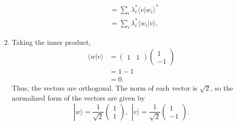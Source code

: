 \documentclass[12 pt]{article}
\begin{document}
\begin{enumerate}
\begin{align*}
	&=\sum_i\lambda_i^* \langle v|w_i\rangle^* \\
	&=\sum_i\lambda_i^* \langle w_i|v\rangle.
\end{align*}
\item Taking the inner product,
\begin{align*}
	\langle w|v\rangle &= \begin{pmatrix}
		1 & 1
	\end{pmatrix}\begin{pmatrix}
		1\\-1
	\end{pmatrix}\\
	&=1-1 \\
	&=0.
\end{align*}
Thus, the vectors are orthogonal. The norm of each vector is $\sqrt{2}$, so the normalized form of the vectors are given by
$$|w\rangle=\frac{1}{\sqrt{2}}\begin{pmatrix}
	1\\1
\end{pmatrix}, \ \  |v\rangle=\frac{1}{\sqrt{2}}\begin{pmatrix}
	1\\-1
\end{pmatrix}.$$
\end{enumerate}
\end{document}
